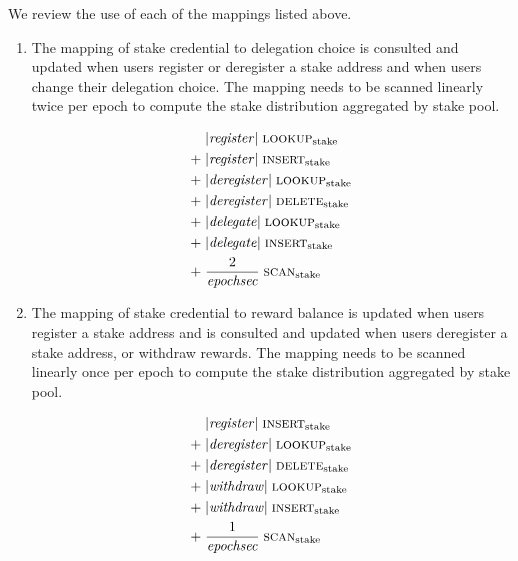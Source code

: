 \documentclass[11pt,a4paper]{article}
\begin{document}
We review the use of each of the mappings listed above.
\begin{enumerate}
\item The mapping of stake credential to delegation choice is consulted and
      updated when users register or deregister a stake address and when users
      change their delegation choice. The mapping needs to be scanned linearly
      twice per epoch to compute the stake distribution aggregated by stake
      pool.

      \begin{equation}
      \begin{aligned}
            & |\mathit{register}| \; \text{{\sc lookup}}_\text{stake} \\
       + \; & |\mathit{register}| \; \text{{\sc insert}}_\text{stake} \\
       + \; & |\mathit{deregister}| \; \text{{\sc lookup}}_\text{stake} \\
       + \; & |\mathit{deregister}| \; \text{{\sc delete}}_\text{stake} \\
       + \; & |\mathit{delegate}| \; \text{{\sc lookup}}_\text{stake} \\
       + \; & |\mathit{delegate}| \; \text{{\sc insert}}_\text{stake} \\
       + \; & \frac{2}{\mathit{epochsec}} \; \text{{\sc scan}}_\text{stake} \\
      \end{aligned}
      \end{equation}

\item The mapping of stake credential to reward balance is updated when users
      register a stake address and is consulted and updated when users
      deregister a stake address, or withdraw rewards. The mapping needs to be
      scanned linearly once per epoch to compute the stake distribution
      aggregated by stake pool.

      \begin{equation}
      \begin{aligned}
            & |\mathit{register}| \; \text{{\sc insert}}_\text{stake} \\
       + \; & |\mathit{deregister}| \; \text{{\sc lookup}}_\text{stake} \\
       + \; & |\mathit{deregister}| \; \text{{\sc delete}}_\text{stake} \\
       + \; & |\mathit{withdraw}| \; \text{{\sc lookup}}_\text{stake} \\
       + \; & |\mathit{withdraw}| \; \text{{\sc insert}}_\text{stake} \\
       + \; & \frac{1}{\mathit{epochsec}} \; \text{{\sc scan}}_\text{stake} \\
      \end{aligned}
      \end{equation}


\end{enumerate}
\end{document}
